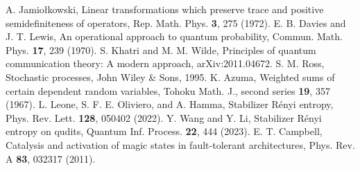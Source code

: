 \documentclass[aps,pra,twocolumn,floatfix,amsfonts,10pt]{revtex4-2}
\begin{document}
\begin{thebibliography}{}
	A. Jamiołkowski, Linear transformations which preserve trace and positive semidefiniteness of operators, Rep. Math. Phys. \textbf{3}, 275 (1972).
	E. B. Davies and J. T. Lewis, An operational approach to quantum probability, Commun. Math. Phys. \textbf{17}, 239 (1970).
	S. Khatri and M. M. Wilde, Principles of quantum communication theory: A modern approach, arXiv:2011.04672.
	S. M. Ross, Stochastic processes, John Wiley \& Sons, 1995.
	K. Azuma, Weighted sums of certain dependent random variables, Tohoku Math. J., second series \textbf{19}, 357 (1967).
	L. Leone, S. F. E. Oliviero, and A. Hamma, Stabilizer R\'enyi entropy, Phys. Rev. Lett. \textbf{128}, 050402 (2022).
	Y. Wang and Y. Li, Stabilizer R\'enyi entropy on qudits, Quantum Inf. Process. \textbf{22}, 444 (2023).
	E. T. Campbell, Catalysis and activation of magic states in fault-tolerant architectures, Phys. Rev. A \textbf{83}, 032317 (2011).
\end{thebibliography}
\end{document}
